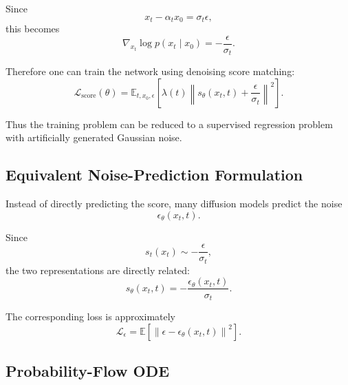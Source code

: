 Since
\begin{equation}
    x_t-\alpha_t x_0
    =
    \sigma_t\epsilon,
\end{equation}
this becomes
\begin{equation}
    \nabla_{x_t}
    \log p(x_t\mid x_0)
    =
    -
    \frac{\epsilon}{\sigma_t}.
\end{equation}

Therefore one can train the network using denoising score matching:
\begin{equation}
    \mathcal L_{\mathrm{score}}(\theta)
    =
    \mathbb E_{
        t,x_0,\epsilon
    }
    \left[
        \lambda(t)
        \left\|
        s_\theta(x_t,t)
        +
        \frac{\epsilon}{\sigma_t}
        \right\|^2
    \right].
\end{equation}

Thus the training problem can be reduced to a supervised regression problem
with artificially generated Gaussian noise.


\subsection{Equivalent Noise-Prediction Formulation}

Instead of directly predicting the score, many diffusion models predict the
noise
\begin{equation}
    \epsilon_\theta(x_t,t).
\end{equation}

Since
\begin{equation}
    s_t(x_t)
    \sim
    -
    \frac{\epsilon}{\sigma_t},
\end{equation}
the two representations are directly related:
\begin{equation}
    s_\theta(x_t,t)
    =
    -
    \frac{
        \epsilon_\theta(x_t,t)
    }{
        \sigma_t
    }.
\end{equation}

The corresponding loss is approximately
\begin{equation}
    \mathcal L_\epsilon
    =
    \mathbb E
    \left[
        \left\|
        \epsilon
        -
        \epsilon_\theta(x_t,t)
        \right\|^2
    \right].
\end{equation}


\subsection{Probability-Flow ODE}

